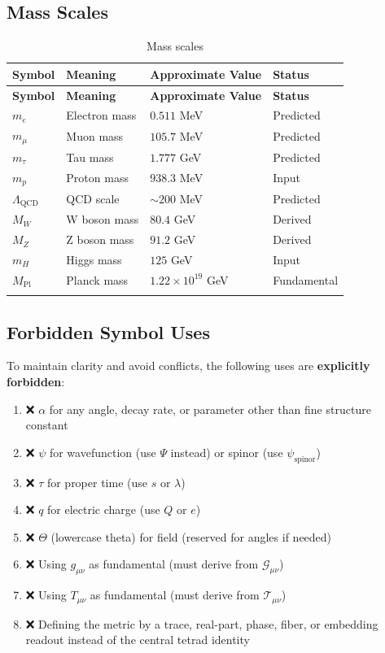 \subsection{Mass Scales}

\begin{longtable}{|l|p{5cm}|p{4cm}|p{3cm}|}
\hline
\textbf{Symbol} & \textbf{Meaning} & \textbf{Approximate Value} & \textbf{Status} \\
\hline
\endfirsthead
\hline
\textbf{Symbol} & \textbf{Meaning} & \textbf{Approximate Value} & \textbf{Status} \\
\hline
\endhead

$m_e$ & Electron mass & $0.511$ MeV & Predicted \\
\hline
$m_\mu$ & Muon mass & $105.7$ MeV & Predicted \\
\hline
$m_\tau$ & Tau mass & $1.777$ GeV & Predicted \\
\hline
$m_p$ & Proton mass & $938.3$ MeV & Input \\
\hline
$\Lambda_{\text{QCD}}$ & QCD scale & $\sim 200$ MeV & Predicted \\
\hline
$M_W$ & W boson mass & $80.4$ GeV & Derived \\
\hline
$M_Z$ & Z boson mass & $91.2$ GeV & Derived \\
\hline
$m_H$ & Higgs mass & $125$ GeV & Input \\
\hline
$M_{\text{Pl}}$ & Planck mass & $1.22 \times 10^{19}$ GeV & Fundamental \\
\hline

\caption{Mass scales}
\label{tab:canonical:mass_scales}
\end{longtable}

\subsection{Forbidden Symbol Uses}

To maintain clarity and avoid conflicts, the following uses are \textbf{explicitly forbidden}:

\begin{enumerate}
    \item ❌ $\alpha$ for any angle, decay rate, or parameter other than fine structure constant
    \item ❌ $\psi$ for wavefunction (use $\Psi$ instead) or spinor (use $\psi_{\text{spinor}}$)
    \item ❌ $\tau$ for proper time (use $s$ or $\lambda$)
    \item ❌ $q$ for electric charge (use $Q$ or $e$)
    \item ❌ $\Theta$ (lowercase theta) for field (reserved for angles if needed)
    \item ❌ Using $g_{\mu\nu}$ as fundamental (must derive from $\mathcal{G}_{\mu\nu}$)
    \item ❌ Using $T_{\mu\nu}$ as fundamental (must derive from $\mathcal{T}_{\mu\nu}$)
    \item ❌ Defining the metric by a trace, real-part, phase, fiber, or embedding readout instead of the central tetrad identity
\end{enumerate}


